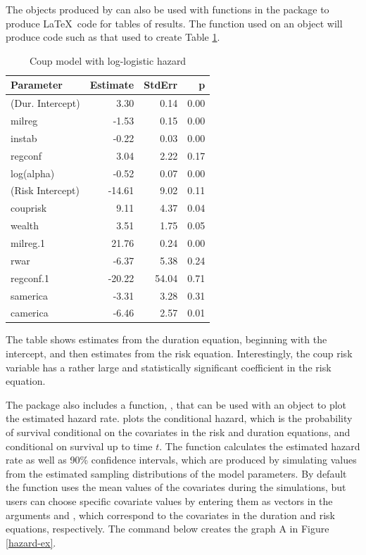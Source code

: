 \documentclass[article]{jss}
\begin{document}
The objects produced by  can also be used with functions in
the  package to produce \LaTeX~code for tables of results.
The  function used on an  object will produce
code such as that used to create Table \ref{loglog_table}.

\begin{table}[ht]
\centering
\caption{Coup model with log-logistic hazard} 
\label{loglog_table}
\begin{tabular}{lrrr}
  \hline
Parameter & Estimate & StdErr & p \\ 
  \hline
(Dur. Intercept) & 3.30 & 0.14 & 0.00 \\ 
  milreg & -1.53 & 0.15 & 0.00 \\ 
  instab & -0.22 & 0.03 & 0.00 \\ 
  regconf & 3.04 & 2.22 & 0.17 \\ 
  log(alpha) & -0.52 & 0.07 & 0.00 \\ 
  (Risk Intercept) & -14.61 & 9.02 & 0.11 \\ 
  couprisk & 9.11 & 4.37 & 0.04 \\ 
  wealth & 3.51 & 1.75 & 0.05 \\ 
  milreg.1 & 21.76 & 0.24 & 0.00 \\ 
  rwar & -6.37 & 5.38 & 0.24 \\ 
  regconf.1 & -20.22 & 54.04 & 0.71 \\ 
  samerica & -3.31 & 3.28 & 0.31 \\ 
  camerica & -6.46 & 2.57 & 0.01 \\ 
   \hline
\end{tabular}
\end{table}

The table shows estimates from the duration equation, beginning with the
intercept, and then estimates from the risk equation. Interestingly, the
coup risk variable has a rather large and statistically significant
coefficient in the risk equation.

The package also includes a function, , that can be
used with an  object to plot the estimated hazard rate.
 plots the conditional hazard, which is the
probability of survival conditional on the covariates in the risk and
duration equations, and conditional on survival up to time \(t\). The
function calculates the estimated hazard rate as well as 90\% confidence
intervals, which are produced by simulating values from the estimated
sampling distributions of the model parameters. By default the function
uses the mean values of the covariates during the simulations, but users
can choose specific covariate values by entering them as vectors in the
arguments  and , which correspond to the
covariates in the duration and risk equations, respectively. The command
below creates the graph A in Figure \ref{hazard-ex}.
\end{document}
